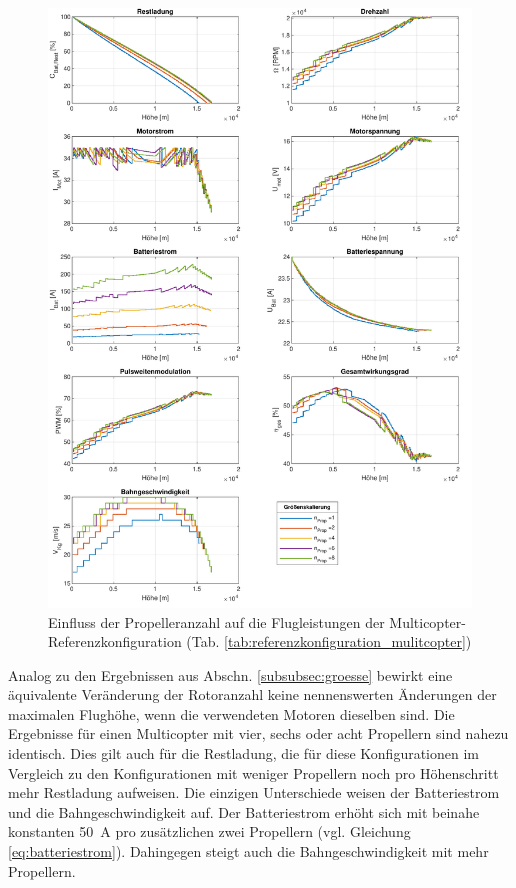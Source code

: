 \begin{figure}[H]
	\includegraphics[scale=0.7]{Diagramme/Anz_Prop.pdf}
	\caption{Einfluss der Propelleranzahl auf die Flugleistungen der Multicopter-Referenzkonfiguration (Tab. \ref{tab:referenzkonfiguration_mulitcopter})}
	\label{abb:groessenskalierung}
\end{figure}
Analog zu den Ergebnissen aus Abschn. \ref{subsubsec:groesse} bewirkt eine äquivalente Veränderung der Rotoranzahl keine nennenswerten Änderungen der maximalen Flughöhe, wenn die verwendeten Motoren dieselben sind. Die Ergebnisse für einen Multicopter mit vier, sechs oder acht Propellern sind nahezu identisch. Dies gilt auch für die Restladung, die für diese Konfigurationen im Vergleich zu den Konfigurationen mit weniger Propellern noch pro Höhenschritt mehr Restladung aufweisen. Die einzigen Unterschiede weisen der Batteriestrom und die Bahngeschwindigkeit auf. Der Batteriestrom erhöht sich mit beinahe konstanten \SI{50}{A} pro zusätzlichen zwei Propellern (vgl. Gleichung \ref{eq:batteriestrom}). Dahingegen steigt auch die Bahngeschwindigkeit mit mehr Propellern. \\
